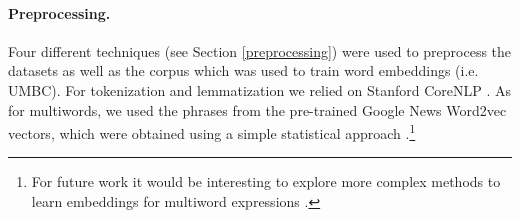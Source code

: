 \documentclass[11pt,a4paper]{article}
\begin{document}
\begin{table}
\begin{center}
{
\setlength{\tabcolsep}{6.0pt}
}
\end{center}
\caption{\label{tab:statsdatasets} 
Evaluation datasets for topic categorization and polarity detection.}
\end{table}


\paragraph{Preprocessing.} 
Four different techniques (see Section \ref{preprocessing}) were used to preprocess the datasets as well as the corpus which was used to train word embeddings (i.e. UMBC). For tokenization and lemmatization we relied on Stanford CoreNLP \cite{manning-EtAl:2014:P14-5}. As for multiwords, we used the phrases from the pre-trained Google News Word2vec vectors, which were obtained using a simple statistical approach \cite{mikolov2013distributed}.\footnote{For future work it would be interesting to explore more complex methods to learn embeddings for multiword expressions \cite{yin2014exploration,Poliak:2017EACL}.} 
\end{document}
